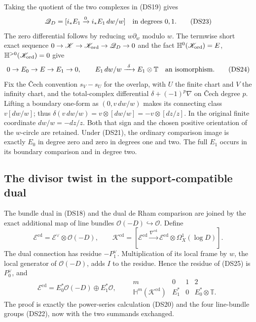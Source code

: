 \documentclass{article}
\begin{document}
Taking the quotient of the two complexes in (DS19) gives
\[
 \mathscr Q_D=[i_*E_1\xrightarrow{0}i_*E_1\,dw/w]
 \quad\hbox{in degrees }0,1.
 \tag{DS23}
\]
The zero differential follows by reducing $w\partial_w$ modulo $w$.
The termwise short exact sequence
$0\to\mathscr K\to\mathscr K_{\rm ord}\to\mathscr Q_D\to0$
and the fact $\mathbb H^0(\mathscr K_{\rm ord})=E$,
$\mathbb H^{>0}(\mathscr K_{\rm ord})=0$ give
\[
0\to E_0\to E\to E_1\to0,
\qquad
 E_1\,dw/w\xrightarrow{\ \delta\ }E_1\otimes\mathbb T
 \quad\hbox{an isomorphism}.
 \tag{DS24}
\]
Fix the \v Cech convention $s_V-s_U$ for the overlap, with $U$ the
finite chart and $V$ the infinity chart, and the total-complex
differential $\delta+(-1)^p\nabla$ on \v Cech degree $p$.
Lifting a boundary one-form
as $(0,v\,dw/w)$ makes its connecting class $v[dw/w]$; thus
$\delta(v\,dw/w)=v\otimes[dw/w]=-v\otimes[dz/z]$.  In the original finite coordinate
$dw/w=-dz/z$.  Both that sign and the chosen positive orientation of
the $w$-circle are retained.  Under (DS21), the ordinary comparison
image is exactly $E_0$ in degree zero and zero in degrees one and two.
The full $E_1$ occurs in its boundary comparison and in degree two.

\subsection{The divisor twist in the support-compatible dual}

The bundle dual in (DS18) and the dual de Rham comparison are joined
by the exact additional map of line bundles
$\mathcal O(-D)\hookrightarrow\mathcal O$.  Define
\[
 \mathscr E^{\mathrm{cd}}=\mathscr E^\vee\otimes\mathcal O(-D),
 \qquad
 \mathscr K^{\mathrm{cd}}=
 [\mathscr E^{\mathrm{cd}}\xrightarrow{\nabla^{\mathrm{cd}}}
  \mathscr E^{\mathrm{cd}}\otimes\Omega_X^1(\log D)].
 \tag{DS25}
\]
The dual connection has residue $-P_1^\vee$.  Multiplication of its
local frame by $w$, the local generator of $\mathcal O(-D)$, adds
$I$ to the residue.  Hence the residue of (DS25) is $P_0^\vee$,
and
\[
 \mathscr E^{\mathrm{cd}}
 =E_0^*\mathcal O(-D)\oplus E_1^*\mathcal O,
 \qquad
 \begin{array}{c|ccc}
 m&0&1&2\\\hline
 \mathbb H^m(\mathscr K^{\mathrm{cd}})&E_1^*&0&E_0^*\otimes\mathbb T.
 \end{array}
 \tag{DS26}
\]
The proof is exactly the power-series calculation (DS20) and the
four line-bundle groups (DS22), now with the two summands exchanged.
\end{document}
